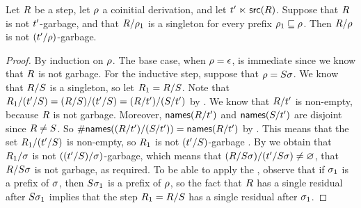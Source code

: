 \begin{lemma}
Let $R$ be a step, let $\rho$ a coinitial derivation,
and let $t' \mathrel{\ltimes} \mathsf{src}(R)$.
Suppose that $R$ is not $t'$-garbage,
and that $R / \rho_1$ is a singleton for every prefix $\rho_1 \sqsubseteq \rho$.
Then $R/\rho$ is not $(t'/\rho)$-garbage.
\end{lemma}
\begin{proof}
By induction on $\rho$.
The base case, when $\rho = \epsilon$, is immediate
since we know that $R$ is not garbage.
For the inductive step, suppose that $\rho = S\sigma$.
We know that $R/S$ is a singleton,
so let $R_1 = R/S$.
Note that
$
  R_1/(t'/S)
  = (R/S)/(t'/S)
  = (R/t')/(S/t')
$ by .
We know that $R/t'$ is non-empty, because $R$ is not garbage.
Moreover, $\mathsf{names}(R/t')$ and $\mathsf{names}(S/t')$ are disjoint
since $R \neq S$.
So $\#\mathsf{names}((R/t')/(S/t')) = \mathsf{names}(R/t')$ by .
This means that the set $R_1/(t'/S)$ is non-empty,
so $R_1$ is not $(t'/S)$-garbage .
By \ih we obtain that $R_1/\sigma$ is not $((t'/S)/\sigma)$-garbage,
which means that
$(R/S\sigma)/(t'/S\sigma) \neq \varnothing$,
\ie that $R/S\sigma$ is not garbage, as required.
To be able to apply the \ih, observe that if $\sigma_1$ is a prefix of $\sigma$,
then $S\sigma_1$ is a prefix of $\rho$,
so the fact that $R$ has a single residual after $S\sigma_1$
implies that the step $R_1 = R/S$ has a single residual after $\sigma_1$.
\end{proof}

